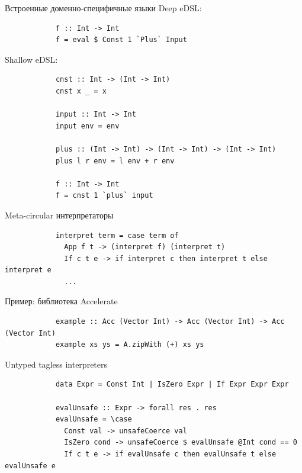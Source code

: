     \begin{frame}[fragile]{Встроенные доменно-специфичные языки}
        \pause
        Deep eDSL:
        \begin{verbatim}
            f :: Int -> Int
            f = eval $ Const 1 `Plus` Input
        \end{verbatim}
        \pause\vspace{1em}
        Shallow eDSL:
        \begin{verbatim}
            cnst :: Int -> (Int -> Int)
            cnst x _ = x

            input :: Int -> Int
            input env = env

            plus :: (Int -> Int) -> (Int -> Int) -> (Int -> Int)
            plus l r env = l env + r env

            f :: Int -> Int
            f = cnst 1 `plus` input
        \end{verbatim}
    \end{frame}

    \begin{frame}[fragile]{Meta-circular интерпретаторы}
        \pause
        \begin{verbatim}
            interpret term = case term of
              App f t -> (interpret f) (interpret t)
              If c t e -> if interpret c then interpret t else interpret e
              ...
        \end{verbatim}
    \end{frame}

    \begin{frame}[fragile]{Пример: библиотека Accelerate}
        \pause
        \begin{verbatim}
            example :: Acc (Vector Int) -> Acc (Vector Int) -> Acc (Vector Int)
            example xs ys = A.zipWith (+) xs ys
        \end{verbatim}
    \end{frame}


    \begin{frame}[fragile]{Untyped tagless interpreters}
        \pause
        \begin{verbatim}
            data Expr = Const Int | IsZero Expr | If Expr Expr Expr

            evalUnsafe :: Expr -> forall res . res
            evalUnsafe = \case
              Const val -> unsafeCoerce val
              IsZero cond -> unsafeCoerce $ evalUnsafe @Int cond == 0
              If c t e -> if evalUnsafe c then evalUnsafe t else evalUnsafe e
        \end{verbatim}
    \end{frame}

